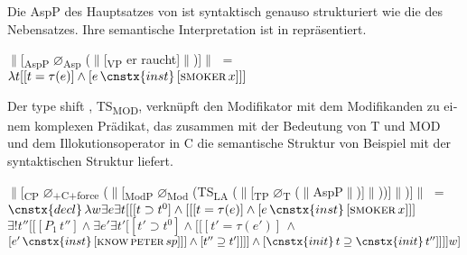 \documentclass[output=paper, colorlinks, citecolor=brown, booklanguage=german]{langscibook}
\begin{document}
\begin{otherlanguage}{german}
\noindent Die AspP des Hauptsatzes von  ist syntaktisch genauso strukturiert wie die des Nebensatzes. Ihre semantische Interpretation ist in  repräsentiert.

\ea \label{ex:18:30} $\parallel$[\textsubscript{AspP} $\varnothing$\textsubscript{Asp} ($\parallel$[\textsubscript{VP} er raucht]$\parallel$)]$\parallel$ $=$ \newline
$\lambda t [[t = \tau (e)] \wedge [e \,\cnstx{inst}\, [\textsc{smoker}\, x]]]$
\z

\noindent Der type shift , TS\textsubscript{MOD}, verknüpft den Modifikator  mit dem Modifikanden  zu einem komplexen Prädikat, das zusammen mit der Bedeutung von T und MOD und dem Illokutionsoperator in C die semantische Struktur  von Beispiel  mit der syntaktischen Struktur  liefert.


\ea \label{ex:18:31} $\parallel$[\textsubscript{CP} $\varnothing$\textsubscript{$+$C$+$force} ($\parallel$[\textsubscript{ModP} $\varnothing$\textsubscript{Mod} (TS\textsubscript{LA} ($\parallel$[\textsubscript{TP} $\varnothing$\textsubscript{T} ($\parallel$AspP$\parallel$)]$\parallel$))]$\parallel$)]$\parallel$ $=$
\newline
$\cnstx{decl}\,\lambda w \exists e \exists t [[[t \supset t^0] \wedge [[[t = \tau (e)] \wedge [e \,\cnstx{inst}\, [\textsc{smoker}\, x]]]$ \fbox{$\wedge$} 
\newline
$\exists !t'' [[[P_1\,  t''] \wedge \exists e' \exists t' [[t' \supset t^0] \wedge [[[t' = \tau(e')] \, \wedge$
\newline 
$[e'\,\cnstx{inst}\, [\textsc{know}\,\textsc{peter}\, sp]]] \wedge [t'' \supseteq t']]]] \wedge [\cnstx{init}\, t \supseteq \cnstx{init}\, t'']]]] w]$
\z


\end{otherlanguage}
\end{document}
